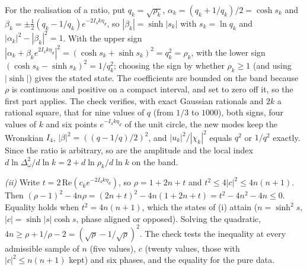For the realisation of a ratio, put $q_{k} = \sqrt{\rho_{k}}$, $\alpha_{k} = (q_{k} + 1/q_{k})/2 = \cosh s_{k}$ and $\beta_{k} = \pm\frac12(q_{k} - 1/q_{k})e^{-2I_{4}k\eta_{d}}$, so $|\beta_{k}| = \sinh|s_{k}|$ with $s_{k} = \ln q_{k}$ and $|\alpha_{k}|^{2} - |\beta_{k}|^{2} = 1$. With the upper sign $|\alpha_{k} + \beta_{k}e^{2I_{4}k\eta_{d}}|^{2} = (\cosh s_{k} + \sinh s_{k})^{2} = q_{k}^{2} = \rho_{k}$, with the lower sign $(\cosh s_{k} - \sinh s_{k})^{2} = 1/q_{k}^{2}$; choosing the sign by whether $\rho_{k} \ge 1$ (and using $|\sinh|$) gives the stated state. The coefficients are bounded on the band because $\rho$ is continuous and positive on a compact interval, and set to zero off it, so the first part applies. The check verifies, with exact Gaussian rationals and $2k$ a rational square, that for nine values of $q$ (from $1/3$ to $1000$), both signs, four values of $k$ and six points $e^{-I_{4}k\eta_{d}}$ of the unit circle, the new modes keep the Wronskian $I_{4}$, $|\beta|^{2} = ((q - 1/q)/2)^{2}$, and $|u_{k}|^{2}/|\chi_{k}|^{2}$ equals $q^{2}$ or $1/q^{2}$ exactly. Since the ratio is arbitrary, so are the amplitude and the local index $d\ln\Delta_{\omega}^{2}/d\ln k = 2 + d\ln\rho_{k}/d\ln k$ on the band.

\emph{(ii)} Write $t = 2\,\mathrm{Re}(c_{k}e^{-2I_{4}k\eta_{d}})$, so $\rho = 1 + 2n + t$ and $t^{2} \le 4|c|^{2} \le 4n(n + 1)$. Then $(\rho - 1)^{2} - 4n\rho = (2n + t)^{2} - 4n(1 + 2n + t) = t^{2} - 4n^{2} - 4n \le 0$. Equality holds when $t^{2} = 4n(n + 1)$, which the states of (i) attain ($n = \sinh^{2}s$, $|c| = \sinh|s|\cosh s$, phase aligned or opposed). Solving the quadratic, $4n \ge \rho + 1/\rho - 2 = (\sqrt\rho - 1/\sqrt\rho)^{2}$. The check tests the inequality at every admissible sample of $n$ (five values), $c$ (twenty values, those with $|c|^{2} \le n(n + 1)$ kept) and six phases, and the equality for the pure data.


